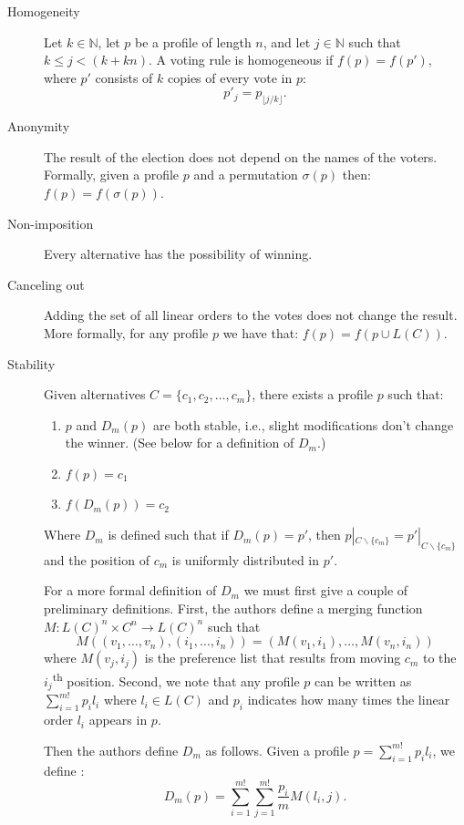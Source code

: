 	\begin{description}
		\item[Homogeneity] Let $k \in \mathbb{N}$, let $p$ be a profile of length $n$, and let $j \in \mathbb{N}$ such that $k \le j < (k + kn)$. A voting rule is homogeneous if $f(p) = f(p')$, where $p'$ consists of $k$ copies of every vote in $p$:
			\[
				p'_j = p_{\lfloor j/k \rfloor}.
			\]
		\item[Anonymity] The result of the election does not depend on the names of the voters. Formally, given a profile $p$ and a permutation $\sigma(p)$ then: $f(p) = f(\sigma(p))$.
		\item[Non-imposition] Every alternative has the possibility of winning.
		\item[Canceling out] Adding the set of all linear orders to the votes does not change the result. More formally, for any profile $p$ we have that: $f(p) = f(p \cup L(C))$.
		\item[Stability] Given alternatives $C = \{c_1, c_2, \ldots, c_m\}$, there exists a profile $p$ such that:
			\begin{enumerate}
				\item $p$ and $D_{m}(p)$ are both stable, i.e., slight modifications don't change the winner. (See below for a definition of $D_{m}$.)
				\item $f(p) = c_1$
				\item $f(D_{m}(p)) = c_2$
			\end{enumerate}
			Where $D_m$ is defined such that if $D_m(p) = p'$, then $p|_{C \backslash \{c_m\}} = p'|_{C \backslash \{c_m\}}$ and the position of $c_m$ is uniformly distributed in $p'$.

			For a more formal definition of $D_m$ we must first give a couple of preliminary definitions. First, the authors define a merging function $M\colon L(C)^n \times C^n \rightarrow L(C)^n$ such that
			\[
				M((v_1, \ldots, v_n), (i_1, \ldots, i_n)) = (M(v_1, i_1), \ldots, M(v_n, i_n))
			\]
			where $M(v_j, i_j)$ is the preference list that results from moving $c_m$ to the $i_j$\textsuperscript{th} position. Second, we note that any profile $p$ can be written as $\sum_{i=1}^{m!} p_i l_i$ where $l_i \in L(C)$ and $p_i$ indicates how many times the linear order $l_i$ appears in $p$.

			Then the authors define $D_m$ as follows. Given a profile $p = \sum_{i=1}^{m!} p_i l_i$, we define \cite{xia2008sufficient}:
			\[
				D_m(p) = \sum_{i=1}^{m!} \sum_{j=1}^{m!} \frac{p_i}{m} M(l_i, j).
			\]
	\end{description}

